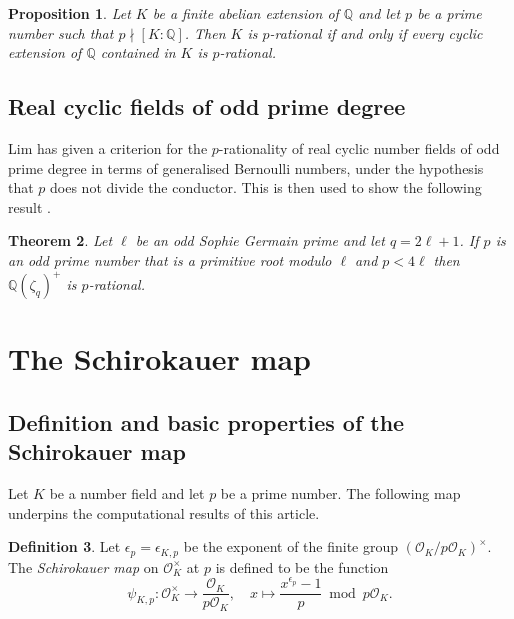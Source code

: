 \documentclass[12pt, a4paper, usenames]{amsart}
\newcommand{\Q}{\mathbb{Q}}
\theoremstyle{plain}
\newtheorem{theorem}{Theorem}[section]
\newtheorem{prop}[theorem]{Proposition}
\theoremstyle{remark}
\theoremstyle{definition}
\newtheorem{definition}[theorem]{Definition}
\begin{document}
\begin{prop}\label{prop:Greenberg-abelian-reduction}
Let $K$ be a finite abelian extension of $\Q$ and let $p$ be a 
prime number such that $p \nmid [K:\Q]$. 
Then $K$ is $p$-rational if and only if every cyclic extension of $\Q$ contained
in $K$ is $p$-rational. 
\end{prop}

\subsection{Real cyclic fields of odd prime degree}\label{subsec:Lim-criterion}
Lim \cite[Proposition~4.1]{MR4330938} has given a criterion for the $p$-rationality 
of real cyclic number fields of odd prime degree in terms of generalised 
Bernoulli numbers,
under the hypothesis that $p$ does not divide the conductor. 
This is then used to show the following result \cite[Theorem~4.6]{MR4330938}.

\begin{theorem}\label{thm:Lim-safe}
Let $\ell$ be an odd Sophie Germain prime and let $q=2\ell + 1$. 
If $p$ is an odd prime number that is a primitive root modulo $\ell$ and 
$p < 4\ell$ then $\Q(\zeta_{q})^{+}$ is $p$-rational.
\end{theorem}

\section{The Schirokauer map}\label{sec:Schirokauer-map}

\subsection{Definition and basic properties of the Schirokauer map}\label{subsec:Schirokauer-def-basic}

Let $K$ be a number field and let $p$ be a prime number.
The following map underpins the computational results of this article.

\begin{definition}\label{def:Schirokauer}
Let $\epsilon_{p}=\epsilon_{K,p}$ be the exponent of the finite group $(\mathcal{O}_{K}/p\mathcal{O}_{K})^{\times}$.
The \textit{Schirokauer map} on $\mathcal{O}_{K}^{\times}$ at $p$
is defined to be the function
\[
\psi_{K,p} \colon \mathcal{O}_{K}^\times \longrightarrow 
\frac{\mathcal{O}_{K}}{p\mathcal{O}_{K}}, 
\quad
x \longmapsto
\frac{x^{\epsilon_{p}} - 1}{p} \bmod p\mathcal{O}_{K}.
\]
\end{definition}
\end{document}
